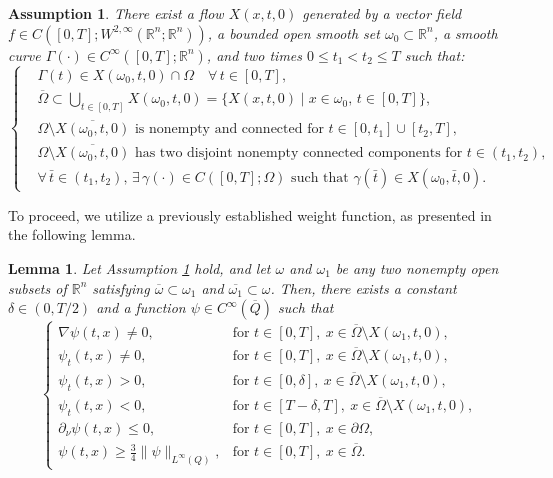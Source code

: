 \documentclass[12pt]{article}
\theoremstyle{plain}
\newtheorem{lemma}[theorem]{Lemma}
\newtheorem{assumption}[theorem]{Assumption}
\theoremstyle{definition}
\begin{document}
\begin{assumption}
\label{Ass:Assum_Obser_1}
There exist a flow $X(x, t, 0)$ generated by a vector field $f \in C([0, T]; W^{2, \infty}(\mathbb{R}^n; \mathbb{R}^n))$, a bounded open smooth set $\omega_0 \subset \mathbb{R}^n$, a smooth curve $\Gamma(\cdot) \in C^\infty([0, T]; \mathbb{R}^n)$, and two times $0 \leq t_1 < t_2 \leq T$ such that:
\[
\left\{
\begin{aligned}
&\Gamma(t) \in X(\omega_0, t, 0) \cap \Omega \quad \forall\, t \in [0, T], \\
&\overline{\Omega} \subset \bigcup_{t \in [0, T]} X(\omega_0, t, 0) = \{ X(x, t, 0) \mid x \in \omega_0,\, t \in [0, T] \}, \\
&\Omega \setminus \overline{X(\omega_0, t, 0)} \text{ is nonempty and connected for } t \in [0, t_1] \cup [t_2, T], \\
&\Omega \setminus \overline{X(\omega_0, t, 0)} \text{ has two disjoint nonempty connected components for } t \in (t_1, t_2), \\
&\forall\, \bar{t} \in (t_1, t_2),\, \exists\, \gamma(\cdot) \in C([0, T]; \Omega) \text{ such that } \gamma(\bar{t}) \in X(\omega_0, \bar{t}, 0).
\end{aligned}
\right.
\]
\end{assumption}













To proceed, we utilize a previously established weight function, as presented in the following lemma.

\begin{lemma}\cite{chaves2014null}\label{lemma:lemma_Observation_1}
Let Assumption \ref{Ass:Assum_Obser_1} hold, and let $\omega$ and $\omega_1$ be any two nonempty open subsets of $\mathbb{R}^n$ satisfying $\overline{\omega} \subset \omega_1$ and $\overline{\omega_1} \subset \omega$. Then, there exists a constant $\delta \in (0, T/2)$ and a function $\psi \in C^\infty(\overline{Q})$ such that
\[
\left\{
\begin{array}{ll}
\nabla \psi(t,x) \neq 0, & \text{for } t \in [0,T],~x \in \overline{\Omega} \setminus X(\omega_1,t,0), \\
\psi_t(t,x) \neq 0, & \text{for } t \in [0,T],~x \in \overline{\Omega} \setminus X(\omega_1,t,0), \\
\psi_t(t,x) > 0, & \text{for } t \in [0,\delta],~x \in \overline{\Omega} \setminus X(\omega_1,t,0), \\
\psi_t(t,x) < 0, & \text{for } t \in [T-\delta,T],~x \in \overline{\Omega} \setminus X(\omega_1,t,0), \\
\partial_\nu \psi(t,x) \leq 0, & \text{for } t \in [0,T],~x \in \partial \Omega, \\
\psi(t,x) \geq \frac{3}{4} \|\psi\|_{L^\infty(Q)}, & \text{for } t \in [0,T],~x \in \overline{\Omega}.
\end{array}
\right.
\]
\end{lemma}
\end{document}
